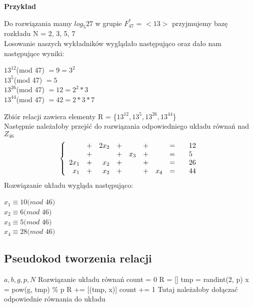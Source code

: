 \documentclass{article}
\begin{document}
\textbf{Przykład}

Do rozwiązania mamy $log_{5}27$ w grupie $F_{47}^*$ = $<13>$ przyjmujemy bazę rozkładu N = {2, 3, 5, 7}\\
Losowanie naszych wykładników wyglądało następująco oraz dało nam następujące wyniki:

\begin{center}
    $13^{12}$(mod 47) $= 9 = 3^2$\\ 
    $13^5$(mod 47) $ =5$\\
    $13^{26}$(mod 47) $= 12 = 2^2 * 3$\\
    $13^{44}$(mod 47) $= 42 = 2 * 3 * 7$\\
\end{center}

Zbiór relacji zawiera elementy R = \{$13^{12}, 13^{5}, 13^{26}, 13^{44}$\}\\
Następnie należałoby przejść do rozwiązania odpowiedniego układu równań nad $Z_{46}$
\[
\left\{
\begin{array}{rcrcrcrc@{\qquad}l}
                & +  & 2x_2 & +   &     & + &  & =  & 12 \\
                & +  &      & +   & x_3 & + &  & =  &  5\\
                2x_1 &        +   & x_2 & + &  & + &  & =  & 26 \\
                x_1  &        +   & x_2 & + &  & + & x_4 & =  & 44 \\

\end{array}
\right.
\]
Rozwiązanie układu wygląda następująco:

\begin{center}



$x_1 \equiv 10 (mod$ $46)$\\
$x_2 \equiv 6 (mod$ $46)$\\
$x_3 \equiv 5 (mod$ $46)$\\
$x_4 \equiv 28 (mod$ $46)$\\
\end{center}

\subsection{Pseudokod tworzenia relacji}
\begin{algorithm}[H]
\renewcommand{\algorithmicrequire}{\textbf{Wejście:}}
\renewcommand{\algorithmicensure}{\textbf{Wyjście:}}
\begin{algorithmic}[1]
    \REQUIRE $a, b, g, p, N$
    \ENSURE  Rozwiązanie układu równań
\STATE count = 0
\STATE R = []
\STATE tmp = randint(2, p)
\STATE x = pow(g, tmp) \% p
\STATE R += [(tmp, x)]
\STATE count += 1
\ENDIF
\ENDWHILE
{}
\STATE Tutaj należałoby dołączać odpowiednie równania do układu
\ENDFOR
{}
\end{algorithmic}
\end{algorithm}
\end{document}
